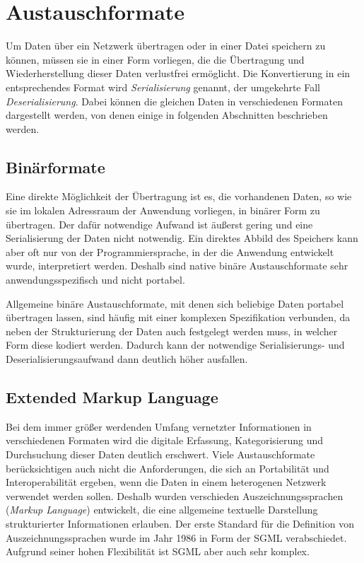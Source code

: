 \section{Austauschformate}\label{sec:datatransfer}
Um Daten über ein Netzwerk übertragen oder in einer Datei speichern zu können,
müssen sie in einer Form vorliegen, die die Übertragung und Wiederherstellung
dieser Daten verlustfrei ermöglicht. Die Konvertierung in ein entsprechendes Format wird
\emph{Serialisierung} genannt, der umgekehrte Fall \emph{Deserialisierung}. Dabei
können die gleichen Daten in verschiedenen Formaten dargestellt werden, von
denen einige in folgenden Abschnitten beschrieben werden.

\subsection{Binärformate}
Eine direkte Möglichkeit der Übertragung ist es, die vorhandenen Daten, so wie
sie im lokalen Adressraum der Anwendung vorliegen, in binärer Form zu übertragen.
Der dafür notwendige Aufwand ist äußerst gering und eine Serialisierung der Daten
nicht notwendig. Ein direktes Abbild des Speichers kann aber oft nur von der
Programmiersprache, in der die Anwendung entwickelt wurde, interpretiert werden.
Deshalb sind native binäre Austauschformate sehr anwendungsspezifisch und nicht
portabel.

Allgemeine binäre Austauschformate, mit denen sich beliebige Daten portabel
übertragen lassen, sind häufig mit einer komplexen Spezifikation verbunden, da
neben der Strukturierung der Daten auch festgelegt werden muss, in welcher Form
diese kodiert werden. Dadurch kann der notwendige Serialisierungs- und
Deserialisierungsaufwand dann deutlich höher ausfallen.

\subsection{Extended Markup Language}\label{subsec:xml}
Bei dem immer größer werdenden Umfang vernetzter Informationen in verschiedenen
Formaten wird die digitale Erfassung, Kategorisierung und Durchsuchung dieser
Daten deutlich erschwert. Viele Austauschformate berücksichtigen auch nicht die
Anforderungen, die sich an Portabilität und Interoperabilität ergeben, wenn die
Daten in einem heterogenen Netzwerk verwendet werden sollen. Deshalb wurden
verschieden Auszeichnungssprachen (\emph{Markup Language}) entwickelt, die eine
allgemeine textuelle Darstellung strukturierter Informationen erlauben. Der erste
Standard für die Definition von Auszeichnungssprachen wurde im Jahr 1986 in Form
der \ac{SGML} \cite{iso8879} verabschiedet. Aufgrund seiner hohen
Flexibilität ist \ac{SGML} aber auch sehr komplex.

